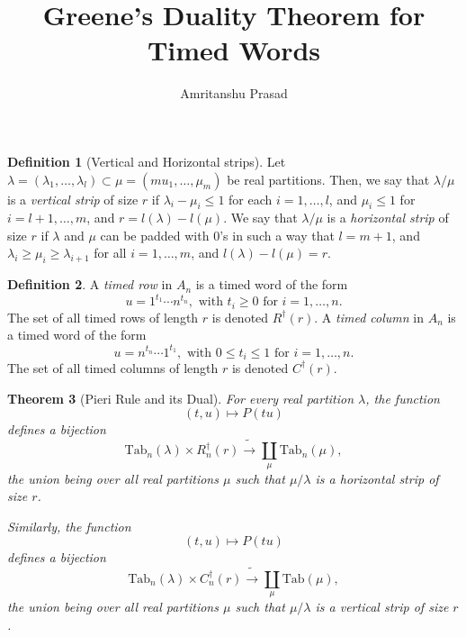 \documentclass[12pt]{amsart}
\title{Greene's Duality Theorem for Timed Words}
\author{Amritanshu Prasad}
\newcommand{\ttab}{\mathrm{Tab}}
\newtheorem{theorem}{Theorem}
\theoremstyle{definition}
\newtheorem{definition}[theorem]{Definition}
\begin{document}
\maketitle
\begin{definition}[Vertical and Horizontal strips]
  Let $\lambda = (\lambda_1,\dotsc,\lambda_l) \subset \mu=(mu_1,\dotsc,\mu_m)$ be real partitions.
  Then, we say that $\lambda/\mu$ is a \emph{vertical strip} of size $r$ if $\lambda_i-\mu_i\leq 1$ for each $i=1,\dotsc, l$, and $\mu_i\leq 1$ for $i=l+1,\dotsc,m$, and $r=l(\lambda)-l(\mu)$.
  We say that $\lambda/\mu$ is a \emph{horizontal strip} of size $r$ if $\lambda$ and $\mu$ can be padded with $0$'s in such a way that $l=m+1$, and $\lambda_i\geq \mu_i\geq \lambda_{i+1}$ for all $i=1,\dotsc,m$, and $l(\lambda)-l(\mu)=r$.
\end{definition}
\begin{definition}
  A \emph{timed row} in $A_n$ is a timed word of the form
  \begin{displaymath}
    u = 1^{t_1} \dotsb n ^{t_n}, \text{ with } t_i\geq 0 \text{ for } i=1,\dotsc,n.
  \end{displaymath}
  The set of all timed rows of length $r$ is denoted $R^\dagger(r)$.
  A \emph{timed column} in $A_n$ is a timed word of the form
  \begin{displaymath}
    u = n^{t_n} \dotsb 1^{t_1}, \text{ with } 0\leq t_i\leq 1 \text{ for } i=1,\dotsc, n.
  \end{displaymath}
  The set of all timed columns of length $r$ is denoted $C^\dagger(r)$.
\end{definition}
\begin{theorem}[Pieri Rule and its Dual]
  For every real partition $\lambda$, the function
  \begin{displaymath}
    (t,u) \mapsto P(tu)
  \end{displaymath}
  defines a bijection
  \begin{displaymath}
    \ttab_n(\lambda) \times R_n^\dagger(r)\tilde\to\coprod_\mu \ttab_n(\mu),
  \end{displaymath}
  the union being over all real partitions $\mu$ such that $\mu/\lambda$ is a horizontal strip of size $r$.

  Similarly, the function
  \begin{displaymath}
    (t,u) \mapsto P(tu)
  \end{displaymath}
  defines a bijection
  \begin{displaymath}
    \ttab_n(\lambda)\times C_n^\dagger(r)\tilde\to\coprod_\mu \ttab(\mu),
  \end{displaymath}
  the union being over all real partitions $\mu$ such that $\mu/\lambda$ is a vertical strip of size $r$.
\end{theorem}
\end{document}
